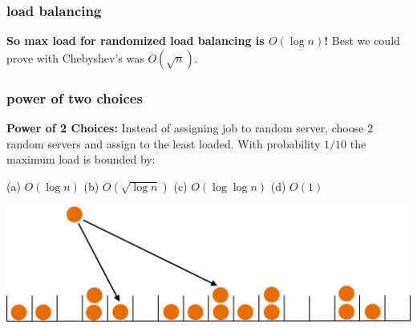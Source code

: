 \documentclass[compress]{beamer}
\begin{document}
\begin{frame}
	\frametitle{load balancing}
	\begin{center}\alert{\textbf{So max load for randomized load balancing is $O(\log n)$!}} Best we could prove with Chebyshev's was $O(\sqrt{n})$. \end{center}
\end{frame}

\begin{frame}
	\frametitle{power of two choices}
	\textbf{Power of 2 Choices:} Instead of assigning job to random server, choose 2 random servers and assign to the least loaded. With probability $1/10$ the maximum load is bounded by:
	
	(a) $O(\log n)$ \hspace{1em} (b) $O(\sqrt{\log n})$  \hspace{1em}  (c) $O(\log \log n)$  \hspace{1em} (d) $O(1)$
	\begin{center}
		\includegraphics[width=.9\textwidth]{power_of_two.png}
	\end{center}
\end{frame}
\end{document}

